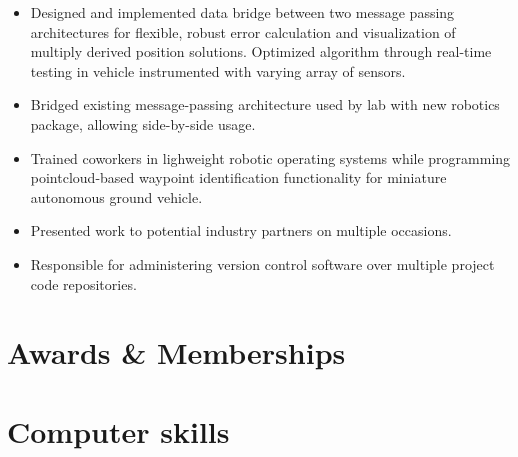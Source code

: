 \documentclass[11pt,letterpaper,sans]{moderncv} %
\begin{document}
{
\begin{itemize}
\item Designed and implemented data bridge between two message passing architectures for flexible, robust error calculation and visualization of multiply derived position solutions. Optimized algorithm through real-time testing in vehicle instrumented with varying array of sensors.
\item Bridged existing message-passing architecture used by lab with new robotics package, allowing side-by-side usage.
\item Trained coworkers in lighweight robotic operating systems while programming pointcloud-based
waypoint identification functionality for miniature autonomous ground vehicle.
\item Presented work to potential industry partners on multiple occasions.
\item Responsible for administering version control software over multiple project code repositories.
\end{itemize}
}


\section{Awards \& Memberships}



\section{Computer skills}

\end{document}
